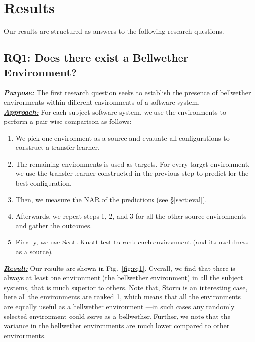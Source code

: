\documentclass[10pt,journal,compsoc]{IEEEtran}
\newcommand{\tion}[1]{\S\ref{sect:#1}}
\newcommand{\be}{\begin{enumerate}}
\newcommand{\ee}{\end{enumerate}}
\begin{document}
\section{Results}
\label{sect:results}

\noindent Our results are structured as answers to the following research questions.

\subsection*{RQ1: Does there exist a Bellwether Environment?}\label{subsec:rq1}

\noindent\textbf{\textit{\underline{Purpose:}}} The first research question seeks to establish the presence of  bellwether environments within different environments of a software system.\\
\textbf{\textit{\underline{Approach:}}} For each subject software system, we use the environments to perform a pair-wise comparison as follows:
\be[leftmargin=*]
\item We pick one environment as a source and evaluate all configurations to construct a transfer learner.
\item The remaining environments is used as targets. For every target environment, we use the transfer learner constructed in the previous step to predict for the best configuration.
\item Then, we measure the NAR of the predictions (see \tion{eval}). %
\item Afterwards, we repeat steps 1, 2, and 3 for all the other source environments and gather the outcomes.
\item Finally, we use Scott-Knott test to rank each environment (and its usefulness as a source).
\ee
\textbf{\textit{\underline{Result:}}}
Our results are shown in Fig.~\ref{fig:rq1}. Overall, we find that there is always at least one environment (the bellwether environment) in all the subject systems, that is much superior to others. Note that, {\sc Storm} is an interesting case, here all the environments are ranked 1, which means that all the environments are equally useful as a bellwether environment
---in such cases any randomly selected environment could serve as a bellwether. 
Further, we note that the variance in the bellwether environments are much lower compared to other environments. 
\end{document}
